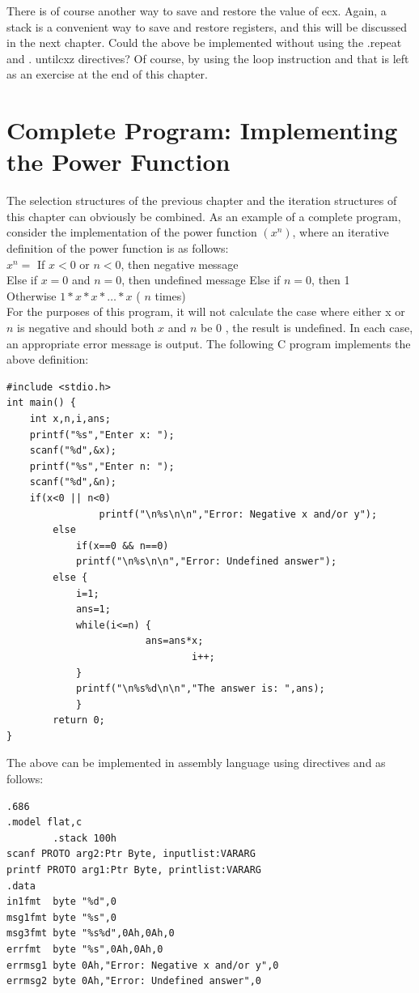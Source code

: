 \documentclass[10pt]{book}
\begin{document}
There is of course another way to save and restore the value of ecx. Again, a stack is a convenient way to save and restore registers, and this will be discussed in the next chapter. Could the above be implemented without using the .repeat and . untilcxz directives? Of course, by using the loop instruction and that is left as an exercise at the end of this chapter.

\section{Complete Program: Implementing the Power Function}
The selection structures of the previous chapter and the iteration structures of this chapter can obviously be combined. As an example of a complete program, consider the implementation of the power function $\left(x^{n}\right)$, where an iterative definition of the power function is as follows:\\
$x^{n}=$ If $x<0$ or $n<0$, then negative message\\
Else if $x=0$ and $n=0$, then undefined message Else if $n=0$, then 1\\
Otherwise $1 * x * x * \ldots * x$ ( $n$ times)\\
For the purposes of this program, it will not calculate the case where either x or $n$ is negative and should both $x$ and $n$ be 0 , the result is undefined. In each case, an appropriate error message is output. The following C program implements the above definition:

\begin{verbatim}
#include <stdio.h>
int main() {
    int x,n,i,ans;
    printf("%s","Enter x: ");
    scanf("%d",&x);
    printf("%s","Enter n: ");
    scanf("%d",&n);
    if(x<0 || n<0)
                printf("\n%s\n\n","Error: Negative x and/or y");
        else
            if(x==0 && n==0)
            printf("\n%s\n\n","Error: Undefined answer");
        else {
            i=1;
            ans=1;
            while(i<=n) {
                        ans=ans*x;
                                i++;
            }
            printf("\n%s%d\n\n","The answer is: ",ans);
            }
        return 0;
}
\end{verbatim}

The above can be implemented in assembly language using directives and as follows:
\begin{verbatim}
.686
.model flat,c
        .stack 100h
scanf PROTO arg2:Ptr Byte, inputlist:VARARG
printf PROTO arg1:Ptr Byte, printlist:VARARG
.data
in1fmt  byte "%d",0
msg1fmt byte "%s",0
msg3fmt byte "%s%d",0Ah,0Ah,0
errfmt  byte "%s",0Ah,0Ah,0
errmsg1 byte 0Ah,"Error: Negative x and/or y",0
errmsg2 byte 0Ah,"Error: Undefined answer",0
\end{verbatim}
\end{document}
